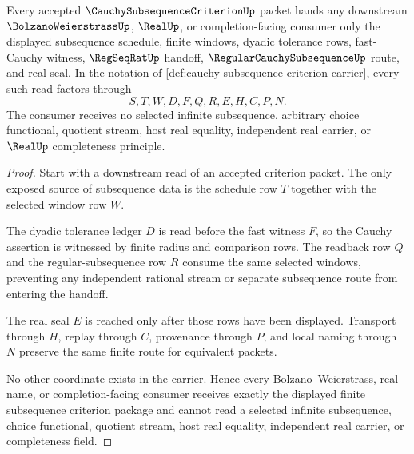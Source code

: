 \begin{theorem}
\label{thm:cauchy-subsequence-criterion-fast-handoff}
Every accepted $\CauchySubsequenceCriterionUp$ packet hands any downstream $\BolzanoWeierstrassUp$, $\RealUp$, or completion-facing consumer only the displayed subsequence schedule, finite windows, dyadic tolerance rows, fast-Cauchy witness, $\RegSeqRatUp$ handoff, $\RegularCauchySubsequenceUp$ route, and real seal. In the notation of \autoref{def:cauchy-subsequence-criterion-carrier}, every such read factors through
$$
S,T,W,D,F,Q,R,E,H,C,P,N.
$$
The consumer receives no selected infinite subsequence, arbitrary choice functional, quotient stream, host real equality, independent real carrier, or $\RealUp$ completeness principle.
\end{theorem}
\begin{proof}
Start with a downstream read of an accepted criterion packet. The only exposed source of subsequence data is the schedule row $T$ together with the selected window row $W$.

The dyadic tolerance ledger $D$ is read before the fast witness $F$, so the Cauchy assertion is witnessed by finite radius and comparison rows. The readback row $Q$ and the regular-subsequence row $R$ consume the same selected windows, preventing any independent rational stream or separate subsequence route from entering the handoff.

The real seal $E$ is reached only after those rows have been displayed. Transport through $H$, replay through $C$, provenance through $P$, and local naming through $N$ preserve the same finite route for equivalent packets.

No other coordinate exists in the carrier. Hence every Bolzano--Weierstrass, real-name, or completion-facing consumer receives exactly the displayed finite subsequence criterion package and cannot read a selected infinite subsequence, choice functional, quotient stream, host real equality, independent real carrier, or completeness field.
\end{proof}

